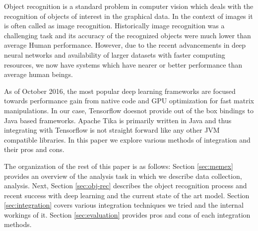 Object recognition is a standard problem in computer vision which deals with the recognition of objects of interest in the graphical data. In the context of images it is often called as image recognition. Historically image recognition was a challenging task and its accuracy of the recognized objects were much lower than average Human performance. However, due to the recent advancements in deep neural networks and availability of larger datasets with faster computing resources, we now have systems which have nearer or better performance than average human beings.



As of October 2016, the most popular deep learning frameworks are focused towards performance gain from native code and GPU optimization for fast matrix manipulations\cite{}. In our case, Tensorflow doesnot provide out of the box bindings to Java based frameworks. Apache Tika is primarily written in Java and thus integrating with Tensorflow is not straight forward like any other JVM compatible libraries. In this paper we explore various methods of integration and their pros and cons.

The organization of the rest of this paper is as follows: Section \ref{sec:memex} provides an overview of the analysis task in which we describe data collection, analysis. Next, Section \ref{sec:obj-rec} describes the object recognition process and recent success with deep learning and the current state of the art model. Section \ref{sec:integration} covers various integration techniques we tried and the internal workings of it. Section \ref{sec:evaluation} provides pros and cons of each integration methods.

